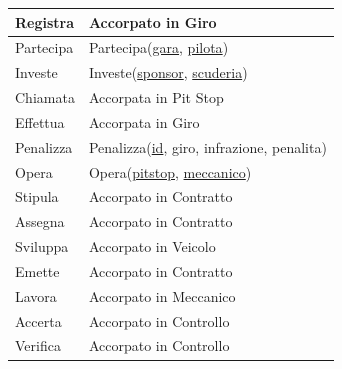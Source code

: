 \documentclass[11pt]{article}
\begin{document}
\begin{center}
{\begin{tabular}{ |l|l| }
            \hline
            Registra & Accorpato in Giro \\
            \hline
            Partecipa & Partecipa(\underline{gara}, \underline{pilota}) \\
            \hline
            Investe & Investe(\underline{sponsor}, \underline{scuderia}) \\
            \hline
            Chiamata & Accorpata in Pit Stop \\
            \hline
            Effettua & Accorpata in Giro \\
            \hline
            Penalizza & Penalizza(\underline{id}, giro, infrazione, penalita) \\
            \hline
            Opera & Opera(\underline{pitstop}, \underline{meccanico}) \\
            \hline
            Stipula & Accorpato in Contratto \\
            \hline
            Assegna & Accorpato in Contratto \\
            \hline
            Sviluppa & Accorpato in Veicolo \\
            \hline
            Emette & Accorpato in Contratto \\
            \hline
            Lavora & Accorpato in Meccanico \\
            \hline
            Accerta & Accorpato in Controllo \\
            \hline
            Verifica & Accorpato in Controllo \\
            \hline
        \end{tabular}
    }
\end{center}
\end{document}
